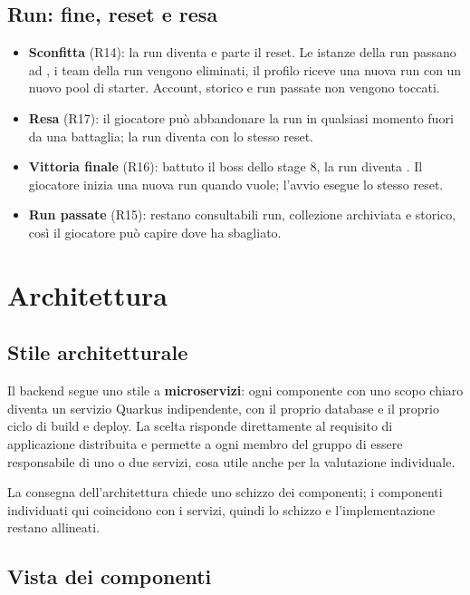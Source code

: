 \documentclass[11pt,a4paper]{article}
\begin{document}
\subsection{Run: fine, reset e resa}

\begin{itemize}
  \item \textbf{Sconfitta} (R14): la run diventa  e parte il reset. Le istanze della run passano ad , i team della run vengono eliminati, il profilo riceve una nuova run con un nuovo pool di starter. Account, storico e run passate non vengono toccati.
  \item \textbf{Resa} (R17): il giocatore può abbandonare la run in qualsiasi momento fuori da una battaglia; la run diventa  con lo stesso reset.
  \item \textbf{Vittoria finale} (R16): battuto il boss dello stage 8, la run diventa . Il giocatore inizia una nuova run quando vuole; l'avvio esegue lo stesso reset.
  \item \textbf{Run passate} (R15): restano consultabili run, collezione archiviata e storico, così il giocatore può capire dove ha sbagliato.
\end{itemize}

\section{Architettura}\label{sec:architettura}

\subsection{Stile architetturale}

Il backend segue uno stile a \textbf{microservizi}: ogni componente con uno scopo chiaro diventa un servizio Quarkus indipendente, con il proprio database e il proprio ciclo di build e deploy. La scelta risponde direttamente al requisito di applicazione distribuita e permette a ogni membro del gruppo di essere responsabile di uno o due servizi, cosa utile anche per la valutazione individuale.

La consegna dell'architettura chiede uno schizzo dei componenti; i componenti individuati qui coincidono con i servizi, quindi lo schizzo e l'implementazione restano allineati.

\subsection{Vista dei componenti}
\end{document}
